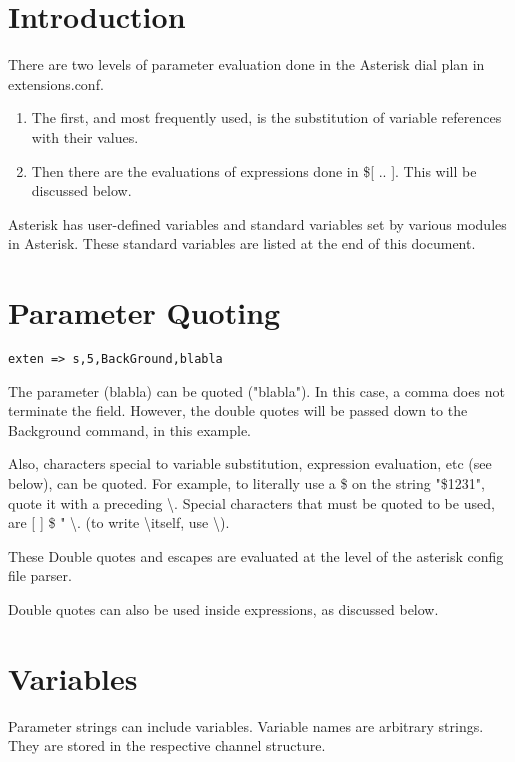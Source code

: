 \section{Introduction}

There are two levels of parameter evaluation done in the Asterisk
dial plan in extensions.conf.
\begin{enumerate}
\item The first, and most frequently used, is the substitution of variable
  references with their values.
\item Then there are the evaluations of expressions done in \$[ .. ].
  This will be discussed below.
\end{enumerate}
Asterisk has user-defined variables and standard variables set
by various modules in Asterisk. These standard variables are
listed at the end of this document.

\section{Parameter Quoting}
\begin{astlisting}
\begin{verbatim}
exten => s,5,BackGround,blabla
\end{verbatim}
\end{astlisting}
The parameter (blabla) can be quoted ("blabla"). In this case, a
comma does not terminate the field. However, the double quotes
will be passed down to the Background command, in this example.

Also, characters special to variable substitution, expression evaluation, etc
(see below), can be quoted. For example, to literally use a \$ on the
string "\$1231", quote it with a preceding \textbackslash. Special characters that must
be quoted to be used, are [ ] \$ " \textbackslash. (to write \textbackslash itself, use \textbackslash).

These Double quotes and escapes are evaluated at the level of the
asterisk config file parser.

Double quotes can also be used inside expressions, as discussed below.

\section{Variables}

Parameter strings can include variables. Variable names are arbitrary strings.
They are stored in the respective channel structure.

